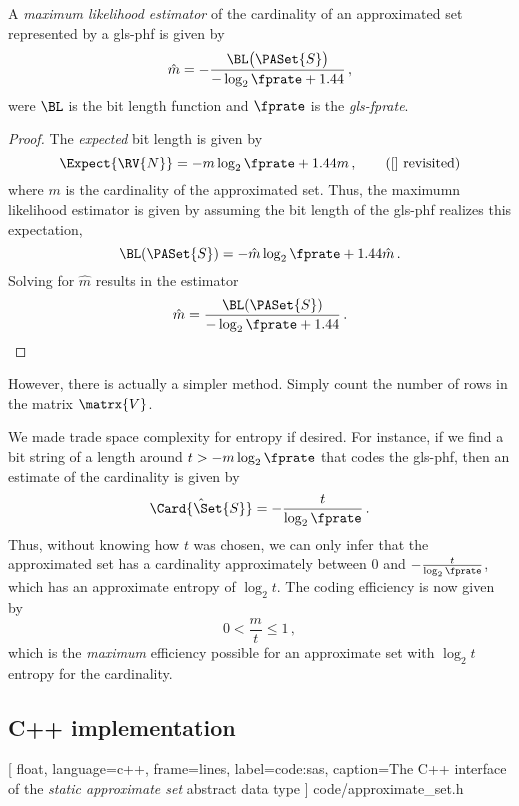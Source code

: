 \documentclass[ ../main.tex]{subfiles}
\begin{document}
\begin{theorem}
A \emph{maximum likelihood estimator} of the cardinality of an approximated set represented by a \gls{gls-phf} is given by
\begin{equation}
    \hat{m} = -\frac{\BL\!\left(\PASet{S}\right)}{-\log_2 \fprate + 1.44}\,,
\end{equation}
were $\BL$ is the bit length function and $\fprate$ is the \emph{\gls{gls-fprate}}.
\end{theorem}
\begin{proof}
The \emph{expected} bit length is given by
\begin{equation*}
    \Expect{\RV{N}} = -m \log_2 \fprate + 1.44 m\,, 
    \tag{\ref{} revisited}
\end{equation*}
where $m$ is the cardinality of the approximated set. Thus, the maximumn likelihood estimator is given by assuming the bit length of the \gls{gls-phf} realizes this expectation,
\begin{equation}
    \BL(\PASet{S}) = -\hat{m} \log_2 \fprate + 1.44 \hat{m}\,.
\end{equation}
Solving for $\hat{m}$ results in the estimator
\begin{equation}
    \hat{m} = \frac{\BL(\PASet{S})}{-\log_2 \fprate + 1.44}\,.
\end{equation}
\end{proof}
However, there is actually a simpler method. Simply count the number of rows in the matrix $\matrx{V}$.

We made trade space complexity for entropy if desired. For instance, if we find a bit string of a length around $t > -m \log_2 \fprate$ that codes the \gls{gls-phf}, then an estimate of the cardinality is given by
\begin{equation}
    \hat{\Card{\Set{S}}} = -\frac{t}{\log_2 \fprate}\,.
\end{equation}
Thus, without knowing how $t$ was chosen, we can only infer that the approximated set has a cardinality approximately between $0$ and $-\frac{t}{\log_2 \fprate}$, which has an approximate entropy of $\log_2 t$. The coding efficiency is now given by
\begin{equation}
    0 < \frac{m}{t} \leq 1\,,
\end{equation}
which is the \emph{maximum} efficiency possible for an approximate set with $\log_2 t$ entropy for the cardinality.

\subsection{C++ implementation}

[
    float,
    language=c++,
    frame=lines,
    label={code:sas},
    caption={The C++ interface of the \emph{static approximate set}} abstract data type
]
{code/approximate_set.h}
\end{document}
